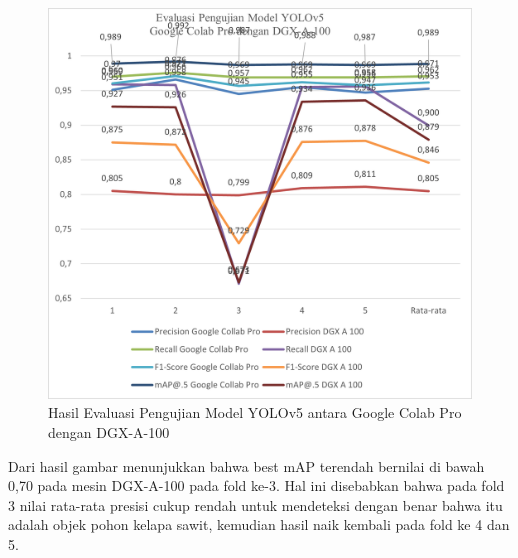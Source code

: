 \begin{figure}[H]
	\vspace{-0.1cm}
	\begin{center}
		\includegraphics[width=1\columnwidth]{bab4/Gambar/Picture28.png}
	\end{center}
	\vspace{-0.2cm}
	\captionsetup{justification=centering}
	\caption{Hasil Evaluasi Pengujian Model YOLOv5 antara Google Colab Pro dengan DGX-A-100}\label{img:Hasil-Evaluasi-Pengujian-Model-YOLOv5-Colab-DGX}
\end{figure}

Dari hasil gambar menunjukkan bahwa best mAP terendah bernilai di bawah 0,70 pada mesin DGX-A-100 pada fold ke-3. Hal ini disebabkan bahwa pada fold 3 nilai rata-rata presisi cukup rendah untuk mendeteksi dengan benar bahwa itu adalah objek pohon kelapa sawit, kemudian hasil naik kembali pada fold ke 4 dan 5. 
